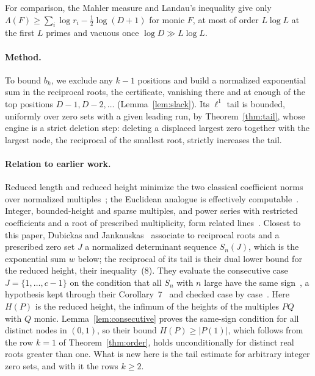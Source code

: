 \documentclass[11pt]{article}
\begin{document}
For comparison, the Mahler measure and Landau's inequality give only
$\Lambda(F)\ge\sum_i\log r_i-\frac12\log(D+1)$ for monic $F$, at most of
order $L\log L$ at the first $L$ primes and vacuous once $\log D\gg L\log L$.

\paragraph{Method.}
To bound $b_k$, we exclude any $k-1$ positions and build a normalized
exponential sum in the reciprocal roots, the certificate, vanishing there
and at enough of the top positions $D-1,D-2,\ldots$
(Lemma~\ref{lem:slack}).  Its $\ell^1$ tail is bounded, uniformly over zero
sets with a given leading run, by Theorem~\ref{thm:tail}, whose
engine is a strict deletion step: deleting a displaced largest zero together
with the largest node, the reciprocal of the smallest root, strictly
increases the tail.

\paragraph{Relation to earlier work.}
Reduced length and reduced height minimize the two classical coefficient
norms over normalized multiples~\cite{dubickas,schinzel,schinzel-ii,schinzel-complex,dj};
the Euclidean analogue is effectively computable~\cite{frw}.  Integer,
bounded-height and sparse multiples, and power series with restricted
coefficients and a root of prescribed multiplicity, form related
lines~\cite{mignotte,bombieri-vaaler,bbbp-multiple,bbbp-ray,grt}.  Closest to
this paper, Dubickas and Jankauskas~\cite{dj} associate to reciprocal roots
and a prescribed zero set $J$ a normalized determinant sequence $S_n(J)$,
which is the exponential sum $w$ below; the reciprocal of its tail is their
dual lower bound for the reduced height, their inequality~(8).  They
evaluate the consecutive case $J=\{1,\ldots,c-1\}$ on the condition that
all $S_n$ with $n$ large have the same sign~\cite[p.~333]{dj}, a hypothesis
kept through their Corollary~7~\cite[Section~2]{dj} and checked case by
case~\cite[Sections~3--4]{dj}.  Here $H(P)$ is the reduced height, the infimum of the
heights of the multiples $PQ$ with $Q$ monic.  Lemma~\ref{lem:consecutive}
proves the same-sign condition for all distinct nodes in $(0,1)$, so their
bound $H(P)\ge|P(1)|$, which follows from the row $k=1$ of Theorem~\ref{thm:order},
holds unconditionally for distinct real roots greater than one.  What is new here is the tail estimate for
arbitrary integer zero sets, and with it the rows $k\ge2$.
\end{document}

